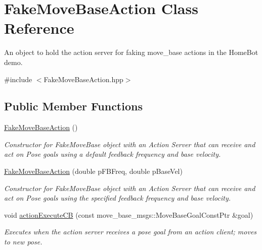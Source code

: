\hypertarget{classFakeMoveBaseAction}{\section{Fake\-Move\-Base\-Action Class Reference}
\label{classFakeMoveBaseAction}
}


An object to hold the action server for faking move\-\_\-base actions in the Home\-Bot demo.  




{\ttfamily \#include $<$Fake\-Move\-Base\-Action.\-hpp$>$}

\subsection*{Public Member Functions}
\begin{DoxyCompactItemize}
\item 
\hypertarget{classFakeMoveBaseAction_a22f349e4529f573adf60f10cd41ee964}{\hyperlink{classFakeMoveBaseAction_a22f349e4529f573adf60f10cd41ee964}{Fake\-Move\-Base\-Action} ()}\label{classFakeMoveBaseAction_a22f349e4529f573adf60f10cd41ee964}

\begin{DoxyCompactList}\small\item\em Constructor for Fake\-Move\-Base object with an Action Server that can receive and act on Pose goals using a default feedback frequency and base velocity. \end{DoxyCompactList}\item 
\hyperlink{classFakeMoveBaseAction_ad77d47a9087245ab845589a7d1c4bb38}{Fake\-Move\-Base\-Action} (double p\-F\-B\-Freq, double p\-Base\-Vel)
\begin{DoxyCompactList}\small\item\em Constructor for Fake\-Move\-Base object with an Action Server that can receive and act on Pose goals using the specified feedback frequency and base velocity. \end{DoxyCompactList}\item 
void \hyperlink{classFakeMoveBaseAction_ab585af0c3bf936a84c074cc512e7a12c}{action\-Execute\-C\-B} (const move\-\_\-base\-\_\-msgs\-::\-Move\-Base\-Goal\-Const\-Ptr \&goal)
\begin{DoxyCompactList}\small\item\em Executes when the action server receives a pose goal from an action client; moves to new pose. \end{DoxyCompactList}\end{DoxyCompactItemize}


